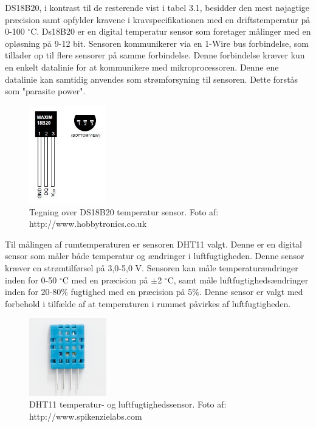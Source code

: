 DS18B20, i kontrast til de resterende vist i tabel 3.1, besidder den mest nøjagtige præcision samt opfylder kravene i kravspecifikationen med en driftstemperatur på 0-100 $^{\circ}$C. Ds18B20 er en digital temperatur sensor som foretager målinger med en opløsning på 9-12 bit. 
\newline
\newline
Sensoren kommunikerer via en 1-Wire bus forbindelse, som tillader op til flere sensorer på samme forbindelse. Denne forbindelse kræver kun en enkelt datalinie for at kommunikere med mikroprocessoren. Denne ene datalinie kan samtidig anvendes som strømforsyning til sensoren. Dette forstås som "parasite power".

\begin{figure}[h!]
  \centering
  \includegraphics[width=0.3\textwidth]{figures/ds18b20-pinout.jpg}
  \caption{Tegning over DS18B20 temperatur sensor. Foto af: http://www.hobbytronics.co.uk}
  \label{ds18b20_pins}
\end{figure} 

Til målingen af rumtemperaturen er sensoren DHT11 valgt. Denne er en digital sensor som måler både temperatur og ændringer i luftfugtigheden. Denne sensor kræver en strømtilførsel på 3,0-5,0 V. \newline
Sensoren kan måle temperaturændringer inden for 0-50 $^{\circ}$C med en præcision på $\pm$2 $^{\circ}$C, samt måle luftfugtighedsændringer inden for 20-80\% fugtighed med en præcision på 5\%. 
Denne sensor er valgt med forbehold i tilfælde af at temperaturen i rummet påvirkes af luftfugtigheden.

\begin{figure}[h!]
  \centering
  \includegraphics[width=0.3\textwidth]{figures/DHT11.jpg}
  \caption{DHT11 temperatur- og luftfugtighedssensor. Foto af: http://www.spikenzielabs.com}
  \label{dht11_billede}
\end{figure} 
   






\newpage
